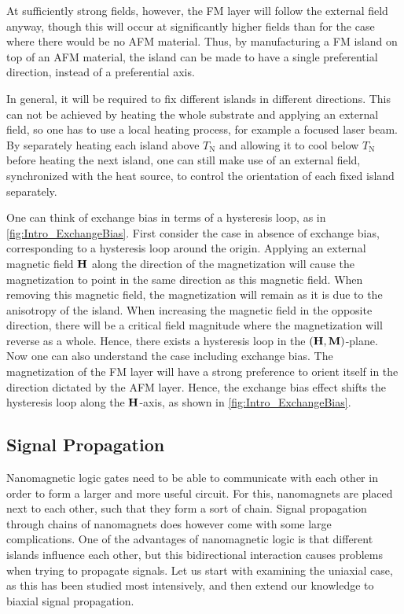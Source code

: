 \documentclass[11pt,a4paper,english,twoside]{article}
\begin{document}
At sufficiently strong fields, however, the FM layer will follow the external field anyway, though this will occur at significantly higher fields than for the case where there would be no AFM material. Thus, by manufacturing a FM island on top of an AFM material, the island can be made to have a single preferential direction, instead of a preferential axis. \par
In general, it will be required to fix different islands in different directions. This can not be achieved by heating the whole substrate and applying an external field, so one has to use a local heating process, for example a focused laser beam. By separately heating each island above $T_\mathrm{N}$ and allowing it to cool below $T_\mathrm{N}$ before heating the next island, one can still make use of an external field, synchronized with the heat source, to control the orientation of each fixed island separately. \par
One can think of exchange bias in terms of a hysteresis loop, as in \cref{fig:Intro_ExchangeBias}. First consider the case in absence of exchange bias, corresponding to a hysteresis loop around the origin. Applying an external magnetic field $\vb{H}$ along the direction of the magnetization will cause the magnetization to point in the same direction as this magnetic field. When removing this magnetic field, the magnetization will remain as it is due to the anisotropy of the island. When increasing the magnetic field in the opposite direction, there will be a critical field magnitude where the magnetization will reverse as a whole. Hence, there exists a hysteresis loop in the $(\vb{H}, \vb{M})$-plane. Now one can also understand the case including exchange bias. The magnetization of the FM layer will have a strong preference to orient itself in the direction dictated by the AFM layer. Hence, the exchange bias effect shifts the hysteresis loop along the $\vb{H}$-axis, as shown in \cref{fig:Intro_ExchangeBias}.

\subsection{Signal Propagation}
Nanomagnetic logic gates need to be able to communicate with each other in order to form a larger and more useful circuit. For this, nanomagnets are placed next to each other, such that they form a sort of chain. Signal propagation through chains of nanomagnets does however come with some large complications. One of the advantages of nanomagnetic logic is that different islands influence each other, but this bidirectional interaction causes problems when trying to propagate signals. Let us start with examining the uniaxial case, as this has been studied most intensively, and then extend our knowledge to biaxial signal propagation.
\end{document}
